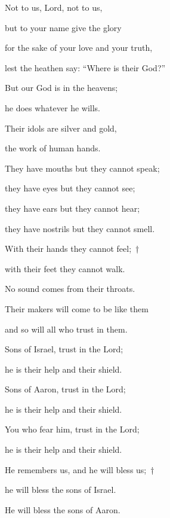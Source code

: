 \noindent Not to us, Lord, not to us,~\GreStar{}~\nopagebreak

but to your name give the glory

\noindent for the sake of your love and your truth,~\GreStar{}~\nopagebreak

lest the heathen say: “Where is their God?”



\noindent But our God is in the heavens;~\GreStar{}~\nopagebreak

he does whatever he wills.

\noindent Their idols are silver and gold,~\GreStar{}~\nopagebreak

the work of human hands.



\noindent They have mouths but they cannot speak;~\GreStar{}~\nopagebreak

they have eyes but they cannot see;

\noindent they have ears but they cannot hear;~\GreStar{}~\nopagebreak

they have nostrils but they cannot smell.



\noindent With their hands they cannot feel;~†~\nopagebreak

with their feet they cannot walk.~\GreStar{}~\nopagebreak

No sound comes from their throats.



\noindent Their makers will come to be like them~\GreStar{}~\nopagebreak

and so will all who trust in them.



\noindent Sons of Israel, trust in the Lord;~\GreStar{}~\nopagebreak

he is their help and their shield.

\noindent Sons of Aaron, trust in the Lord;~\GreStar{}~\nopagebreak

he is their help and their shield.



\noindent You who fear him, trust in the Lord;~\GreStar{}~\nopagebreak

he is their help and their shield.

\noindent He remembers us, and he will bless us;~†~\nopagebreak

he will bless the sons of Israel.~\GreStar{}~\nopagebreak

He will bless the sons of Aaron.



